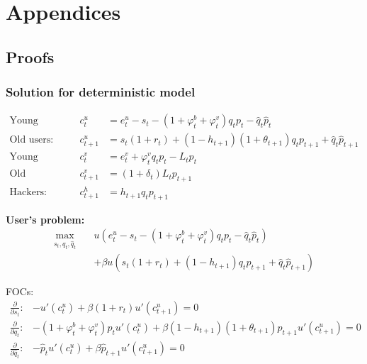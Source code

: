\documentclass[./main.tex]{subfiles}
\begin{document}
\appendix
\section*{Appendices}
\renewcommand{\thesubsection}{\Alph{subsection}}

\subsection{Proofs}

\subsubsection{Solution for deterministic model}

\begin{align}
    \text{Young users: } && c_t^u &= e_t^u - s_t - (1+ \varphi_t^b+\varphi_t^v) q_t p_t - \hat{q}_t \hat{p}_t\\
    \text{Old users: } && c_{t+1}^u &=  s_t (1+r_t) + (1-h_{t+1})(1+\theta_{t+1}) q_t p_{t+1} + \hat{q}_t \hat{p}_{t+1} \\
    \text{Young validators: } && c_t^v &= e_t^v + \varphi_t^v q_t p_t - L_t p_t \\
    \text{Old validators: } && c_{t+1}^v &= (1+\delta_t) L_t p_{t+1} \\
    \text{Hackers: } && c_{t+1}^h &= h_{t+1} q_t p_{t+1}
\end{align}

\noindent \textbf{User's problem:}
\begin{equation}
    \begin{split}    
        \max_{s_t, q_t, \hat{q}_t}\quad & u\left(e_t^u - s_t - (1+ \varphi_t^b+\varphi_t^v) q_t p_t - \hat{q}_t \hat{p}_t\right)\\
        &+ \beta u\left(s_t (1+r_t) + (1-h_{t+1}) q_t p_{t+1} + \hat{q}_t \hat{p}_{t+1}\right)
    \end{split}
\end{equation}

FOCs:
\begin{align}
    \frac{\partial}{\partial s_t}: & -u'(c_t^u) + \beta(1+r_t)u'(c_{t+1}^u) = 0\\
    \frac{\partial}{\partial q_t}: & -(1+\varphi_t^b+\varphi_t^v) p_t u'(c_t^u) + \beta(1-h_{t+1})(1+\theta_{t+1})p_{t+1}u'(c_{t+1}^u) = 0 \\
    \frac{\partial}{\partial \hat{q}_t}: & -\hat{p}_t u'(c_t^u) + \beta \hat{p}_{t+1}u'(c_{t+1}^u) = 0
\end{align}
\end{document}
